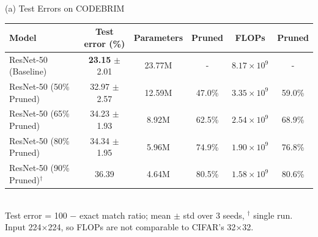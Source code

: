 \begin{table}[t]
\centering
{\small (a) Test Errors on CODEBRIM}\\[2pt]
\begin{tabular}{l|c|c|c|c|c}
\hline
Model & Test error (\%) & Parameters & Pruned & FLOPs & Pruned \\
\hline
ResNet-50 (Baseline) & \textbf{23.15} {\scriptsize$\pm$2.01} & 23.77M & - & $8.17\times10^{9}$ & - \\
ResNet-50 (50\% Pruned) & 32.97 {\scriptsize$\pm$2.57} & 12.59M & 47.0\% & $3.35\times10^{9}$ & 59.0\% \\
ResNet-50 (65\% Pruned) & 34.23 {\scriptsize$\pm$1.93} & 8.92M & 62.5\% & $2.54\times10^{9}$ & 68.9\% \\
ResNet-50 (80\% Pruned) & 34.34 {\scriptsize$\pm$1.95} & 5.96M & 74.9\% & $1.90\times10^{9}$ & 76.8\% \\
ResNet-50 (90\% Pruned)$^\dagger$ & 36.39 & 4.64M & 80.5\% & $1.58\times10^{9}$ & 80.6\% \\
\hline
\end{tabular}
\\[2pt]
{\scriptsize Test error = 100 $-$ exact match ratio; mean $\pm$ std over 3 seeds, $^\dagger$ single run. Input 224$\times$224, so FLOPs are not comparable to CIFAR's 32$\times$32.}
\end{table}
